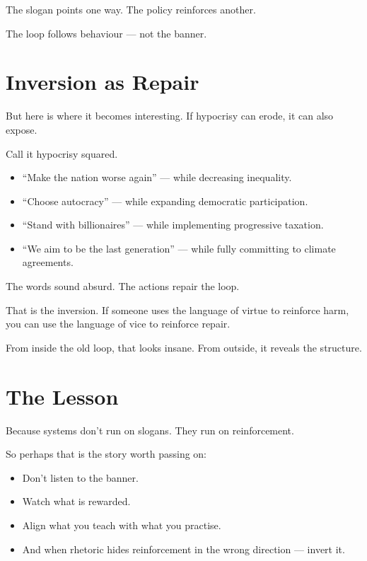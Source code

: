 \documentclass{article}
\begin{document}
The slogan points one way.
The policy reinforces another.

The loop follows behaviour — not the banner.

\section*{Inversion as Repair}

But here is where it becomes interesting.
If hypocrisy can erode, it can also expose.

Call it hypocrisy squared.
\begin{itemize}
    \item ``Make the nation worse again'' — while decreasing inequality.
    \item ``Choose autocracy'' — while expanding democratic participation.
    \item ``Stand with billionaires'' — while implementing progressive taxation.
    \item ``We aim to be the last generation'' — while fully committing to climate agreements.
\end{itemize}

The words sound absurd.
The actions repair the loop.

That is the inversion.
If someone uses the language of virtue to reinforce harm,
you can use the language of vice to reinforce repair.

From inside the old loop, that looks insane.
From outside, it reveals the structure.

\section*{The Lesson}

Because systems don’t run on slogans.
They run on reinforcement.

So perhaps that is the story worth passing on:
\begin{itemize}
    \item Don’t listen to the banner.
    \item Watch what is rewarded.
    \item Align what you teach with what you practise.
    \item And when rhetoric hides reinforcement in the wrong direction — invert it.
\end{itemize}
\end{document}
